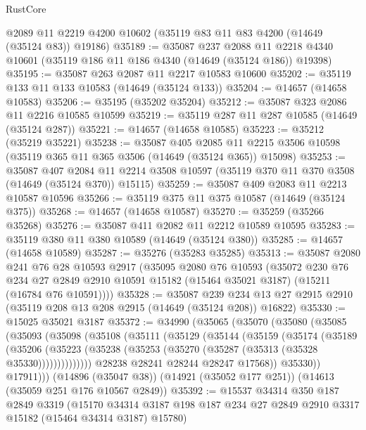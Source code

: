 \begin{lexlean}{RustCore}
\begin{coremodule}
    @2089
    @11
    @2219
    @4200
    @10602
    (@35119 @83 @11 @83 @4200 (@14649 (@35124 @83)) @19186)
@35189 := @35087
    @237
    @2088
    @11
    @2218
    @4340
    @10601
    (@35119 @186 @11 @186 @4340 (@14649 (@35124 @186)) @19398)
@35195 := @35087 @263 @2087 @11 @2217 @10583 @10600
@35202 := @35119 @133 @11 @133 @10583 (@14649 (@35124 @133))
@35204 := @14657 (@14658 @10583)
@35206 := @35195 (@35202 @35204)
@35212 := @35087 @323 @2086 @11 @2216 @10585 @10599
@35219 := @35119 @287 @11 @287 @10585 (@14649 (@35124 @287))
@35221 := @14657 (@14658 @10585)
@35223 := @35212 (@35219 @35221)
@35238 := @35087
    @405
    @2085
    @11
    @2215
    @3506
    @10598
    (@35119 @365 @11 @365 @3506 (@14649 (@35124 @365)) @15098)
@35253 := @35087
    @407
    @2084
    @11
    @2214
    @3508
    @10597
    (@35119 @370 @11 @370 @3508 (@14649 (@35124 @370)) @15115)
@35259 := @35087 @409 @2083 @11 @2213 @10587 @10596
@35266 := @35119 @375 @11 @375 @10587 (@14649 (@35124 @375))
@35268 := @14657 (@14658 @10587)
@35270 := @35259 (@35266 @35268)
@35276 := @35087 @411 @2082 @11 @2212 @10589 @10595
@35283 := @35119 @380 @11 @380 @10589 (@14649 (@35124 @380))
@35285 := @14657 (@14658 @10589)
@35287 := @35276 (@35283 @35285)
@35313 := @35087
    @2080
    @241
    @76
    @28
    @10593
    @2917
    (@35095
      @2080
      @76
      @10593
      (@35072
        @230
        @76
        @234
        @27
        @2849
        @2910
        @10591
        @15182
        (@15464 @35021 @3187)
        (@15211 (@16784 @76 @10591))))
@35328 := @35087
    @239
    @234
    @13
    @27
    @2915
    @2910
    (@35119 @208 @13 @208 @2915 (@14649 (@35124 @208)) @16822)
@35330 := @15025 @35021 @3187
@35372 := @34990
    (@35065
      (@35070
        (@35080
          (@35085
            (@35093
              (@35098
                (@35108
                  (@35111
                    (@35129
                      (@35144
                        (@35159
                          (@35174
                            (@35189
                              (@35206
                                (@35223
                                  (@35238
                                    (@35253 (@35270 (@35287 (@35313 (@35328 @35330))))))))))))))
                  @28238
                  @28241
                  @28244
                  @28247
                  @17568))
              @35330))
          @17911)))
    (@14896 (@35047 @38))
    (@14921 (@35052 @177 @251))
    (@14613 (@35059 @251 @176 @10567 @2849))
@35392 := @15537
    @34314
    @350
    @187
    @2849
    @3319
    (@15170 @34314 @3187 @198 @187 @234 @27 @2849 @2910 @3317 @15182 (@15464 @34314 @3187) @15780)

\end{coremodule}
\end{lexlean}
